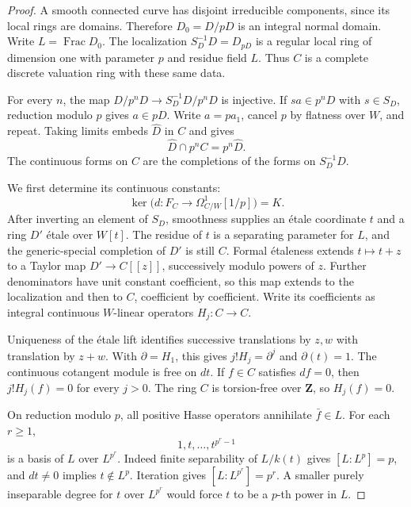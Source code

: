 \documentclass[11pt,a4paper]{amsart}
\numberwithin{equation}{section}
\theoremstyle{definition}
\theoremstyle{remark}
\newcommand{\DtwoZZ}{\mathbf{Z}}
\newcommand{\Dtwowh}{\widehat}
\DeclareMathOperator{\DtwoFrac}{Frac}
\begin{document}
\begin{proof}
A smooth connected curve has disjoint irreducible components, since
its local rings are domains. Therefore \(D_0=D/pD\) is an integral
normal domain. Write \(L=\DtwoFrac D_0\).
The localization \(S_D^{-1}D=D_{pD}\) is a regular local ring of
dimension one with parameter \(p\) and residue field \(L\).
Thus \(C\) is a complete discrete valuation ring with these same
data.

For every \(n\), the map
\(D/p^nD\to S_D^{-1}D/p^nD\) is injective.
If \(sa\in p^nD\) with \(s\in S_D\), reduction modulo \(p\) gives
\(a\in pD\). Write \(a=pa_1\), cancel \(p\) by flatness over \(W\),
and repeat.
Taking limits embeds \(\Dtwowh D\) in \(C\) and gives
\begin{equation}\label{d2:eq:integral-intersection}
 \Dtwowh D\cap p^nC=p^n\Dtwowh D.
\end{equation}
The continuous forms on \(C\) are the completions of the forms on
\(S_D^{-1}D\).

We first determine its continuous constants:
\begin{equation}\label{d2:eq:cohen-constants}
 \ker\bigl(d\colon F_C\to\Omega^1_{C/W}[1/p]\bigr)=K.
\end{equation}
After inverting an element of \(S_D\), smoothness supplies an
\'etale coordinate \(t\) and a ring \(D'\) \'etale over \(W[t]\).
The residue of \(t\) is a separating parameter for \(L\), and the
generic-special completion of \(D'\) is still \(C\).
Formal \'etaleness extends \(t\mapsto t+z\) to a Taylor map
\(D'\to C[[z]]\), successively modulo powers of \(z\).
Further denominators have unit constant coefficient, so this map
extends to the localization and then to \(C\), coefficient by
coefficient.
Write its coefficients as integral continuous \(W\)-linear operators
\(H_j\colon C\to C\).

Uniqueness of the \'etale lift identifies successive translations by
\(z,w\) with translation by \(z+w\).
With \(\partial=H_1\), this gives
\(j!H_j=\partial^j\) and \(\partial(t)=1\).
The continuous cotangent module is free on \(dt\).
If \(f\in C\) satisfies \(df=0\), then
\(j!H_j(f)=0\) for every \(j>0\).
The ring \(C\) is torsion-free over \(\DtwoZZ\), so \(H_j(f)=0\).

On reduction modulo \(p\), all positive Hasse operators annihilate
\(\bar f\in L\).
For each \(r\ge1\),
\[
 1,t,\ldots,t^{p^r-1}
\]
is a basis of \(L\) over \(L^{p^r}\).
Indeed finite separability of \(L/k(t)\) gives
\([L:L^p]=p\), and \(dt\ne0\) implies \(t\notin L^p\).
Iteration gives \([L:L^{p^r}]=p^r\).
A smaller purely inseparable degree for \(t\) over \(L^{p^r}\)
would force \(t\) to be a \(p\)-th power in \(L\).


\end{proof}
\end{document}
